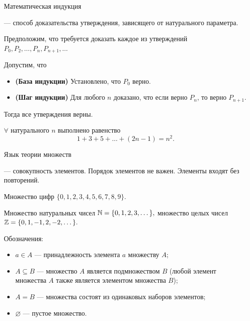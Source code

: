 \begin{frame}{Математическая индукция}

 --- способ доказательства утверждения, зависящего от натурального параметра.


Предположим, что требуется доказать каждое из утверждений $ P_{0},P_{2},\ldots ,P_{n},P_{n+1},\ldots $

Допустим, что
\begin{itemize}
\item {\bf (База индукции)} Установлено, что $P_0$ верно.

\item {\bf (Шаг индукции)} Для любого $n$ доказано, что если верно $P_{n}$, то верно $P_{n+1}$.
\end{itemize}

Тогда все утверждения верны.

\exmpl $\forall$ натурального $n$ выполнено равенство $$1+3+5+\dots +(2n-1)=n^2.$$

\end{frame}


\begin{frame}{Язык теории множеств}

 --- совокупность элементов. Порядок элементов не важен. Элементы входят без повторений.

\exmpl Множество цифр $\{0,1,2,3,4,5,6,7,8,9\}.$

\exmpl Множество натуральных чисел $\mathbb{N} =\{0,1,2,3,\dots \},$ множество целых чисел $\mathbb{Z} =\{0,1,-1,2,-2,\dots \}.$

Обозначения:

\begin{itemize}

\item $a \in A$ --- принадлежность элемента $a$ множеству $A$;

\item $A\subseteq B$ --- множество $A$ является подмножеством $B$ (любой элемент множества $A$ также является элементом множества $B$);

\item $A=B$ --- множества состоят из одинаковых наборов элементов;

\item $\varnothing$ --- пустое множество.

\end{itemize}

\end{frame}


